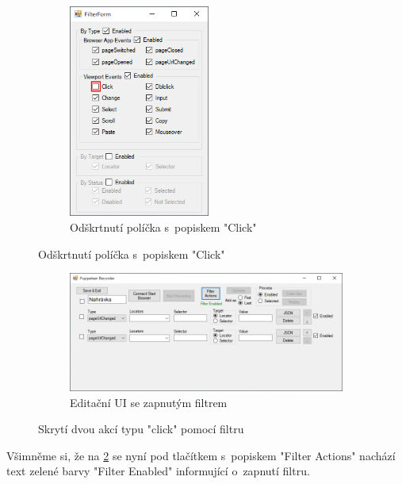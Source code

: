 \documentclass[12pt, a4paper, twoside]{article}
\begin{document}
	\begin{figure}[H]
		\centering
		\begin{subfigure}[t]{1.0\textwidth}
			\centering
			\includegraphics[width=0.51\textwidth]{filterForm4.png}
			\caption{Odškrtnutí políčka s~popiskem "Click"}
		\end{subfigure}
	\end{figure}
	\vspace{-0.7cm}
	\begin{figure}[H]\ContinuedFloat
		\centering
		\textdownarrow
	\end{figure}
	\vspace{-0.6cm}
	\begin{figure}[H]\ContinuedFloat
		\centering
		\begin{subfigure}[t]{1.0\textwidth}
			\centering
			\includegraphics[width=1.0\textwidth]{filtered.png}
			\caption{Editační UI se zapnutým filtrem}
			\label{subfig:editUiFiltered}
		\end{subfigure}
		\caption{Skrytí dvou akcí typu "click" pomocí filtru}
	\end{figure}
	Všimněme si, že na \cref{subfig:editUiFiltered} se nyní pod tlačítkem s~popiskem "Filter Actions" nachází text zelené barvy "Filter Enabled" informující o~zapnutí filtru.
\end{document}
